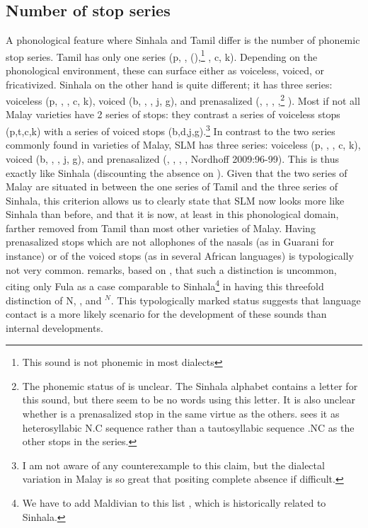 \documentclass[a4paper,10pt]{article}
\begin{document}
\subsection{Number of stop series}
A phonological feature where Sinhala and Tamil differ is the number of phonemic stop series. Tamil has only one series (p, \dentt, (),\footnote{This sound is not phonemic in most dialects} \tz, c, k).    Depending on the phonological environment, these can surface either as voiceless, voiced, or fricativized. Sinhala on the other hand is quite different; it has three series: voiceless (p, \dentt, \tz, c, k), voiced (b, \dentd, \dz, j, g), and prenasalized (\umb, \undentd, \undz, \unJ,\footnote{The
 phonemic status of \unJ{} is unclear. The Sinhala alphabet contains a letter for this sound, but there seem to be no words using this letter. It is also unclear whether \unJ{} is a prenasalized stop in the same virtue as the others. \citet{Matzel1983} sees it as heterosyllabic N.C sequence rather than a tautosyllabic sequence .NC as the other stops in the series.}
\ung). Most if not all Malay varieties have 2 series of stops: they contrast a series of voiceless stops (p,t,c,k) with a series of  voiced stops (b,d,j,g).\footnote{I 
 am not aware of any counterexample to this claim, but the dialectal variation in Malay is so great that positing complete absence if difficult.
}  In contrast to the two series commonly found in varieties of Malay, SLM has three series: voiceless (p, \dentt, \tz, c, k), voiced (b, \dentd, \dz, j, g), and prenasalized (\umb,  \undz, \unj, \ung, Nordhoff 2009:96-99). This is thus exactly like Sinhala (discounting the absence on \undentd{}). Given that the two series of Malay are situated in between the one series of Tamil and the three series of Sinhala, this criterion allows us to clearly state that SLM now looks more like Sinhala than before, and that it is now, at least in this phonological domain, farther removed from Tamil than most other varieties of Malay. Having prenasalized stops which are not allophones of the nasals (as in Guarani for instance) or of the voiced stops (as in several African languages) is typologically not very common. \citet{Downing2005prenas} remarks, based on \citet{MaddiesonEtAl1993}, that such a distinction is uncommon, citing only Fula as a case comparable to Sinhala\footnote{We have to add Maldivian to this list \citep{Fritz2002}, which is historically related to Sinhala.} in having this threefold distinction of N, , and $^N$. This typologically marked status suggests that language contact is a more likely scenario for the development of these sounds than internal developments.
\end{document}
